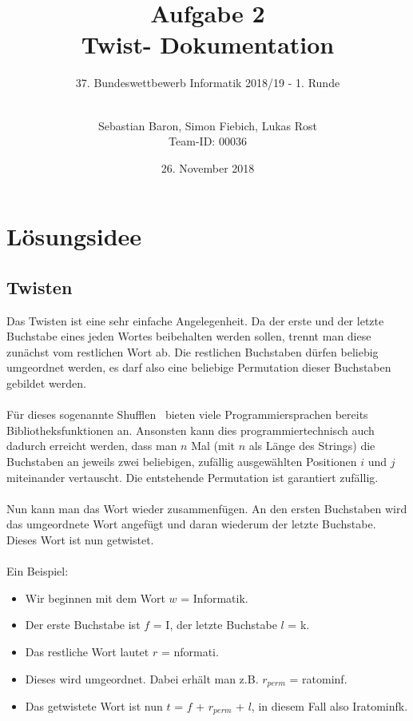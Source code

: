 \documentclass[a4paper, notitlepage, 12pt]{scrartcl}
\author{Sebastian Baron, Simon Fiebich, Lukas Rost \\ \small{Team-ID: 00036}}
\title{Aufgabe 2 \\ \glqq Twist\grqq  - Dokumentation}
\subtitle{37. Bundeswettbewerb Informatik 2018/19 - 1. Runde \\~\\}
\date{26. November 2018}
\begin{document}
\renewcommand{\contentsname}{\centerline{Inhaltsverzeichnis}}
 \maketitle
 \tableofcontents
 \thispagestyle{empty}
 \newpage
 \setcounter{page}{1}

\section{Lösungsidee}
	
\subsection{Twisten}
Das Twisten ist eine sehr einfache Angelegenheit. Da der erste und der letzte Buchstabe eines jeden Wortes beibehalten werden sollen, trennt man diese zunächst vom restlichen Wort ab. Die restlichen Buchstaben dürfen beliebig umgeordnet werden, es darf also eine beliebige Permutation dieser Buchstaben gebildet werden. \\ \\
Für dieses sogenannte \glqq Shufflen\grqq ~ bieten viele Programmiersprachen bereits Bibliotheksfunktionen an. Ansonsten kann dies programmiertechnisch auch dadurch erreicht werden, dass man $n$ Mal (mit $n$ als Länge des Strings) die Buchstaben an jeweils zwei beliebigen, zufällig ausgewählten Positionen $i$ und $j$ miteinander vertauscht. Die entstehende Permutation ist garantiert zufällig. \\ \\
Nun kann man das Wort wieder zusammenfügen. An den ersten Buchstaben wird das umgeordnete Wort angefügt und daran wiederum der letzte Buchstabe. Dieses Wort ist nun getwistet. \\ \\
Ein Beispiel:
\begin{itemize}
	\item Wir beginnen mit dem Wort $w$ = \glqq Informatik\grqq .
	\item Der erste Buchstabe ist $f$ = \glqq I\grqq , der letzte Buchstabe $l$ = \glqq k\grqq.
	\item Das restliche Wort lautet $r$ = \glqq nformati\grqq .
	\item Dieses wird umgeordnet. Dabei erhält man z.B. $r_{perm}$ = \glqq ratominf\grqq .
	\item Das getwistete Wort ist nun $t$ = $f$ + $r_{perm}$ + $l$, in diesem Fall also \glqq Iratominfk\grqq .
\end{itemize}
\end{document}
